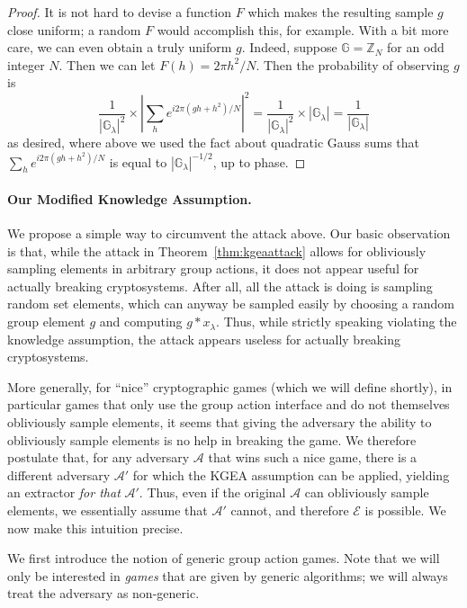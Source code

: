 \documentclass{article}\usepackage[a4paper,margin=20mm]{geometry}
\numberwithin{theorem}{section}
\numberwithin{equation}{section}
\newcommand{\Z}{\mathbb{Z}}
\newcommand{\G}{\mathbb{G}}
\newcommand{\As}{{\mathcal{A}}}
\newcommand{\Es}{{\mathcal{E}}}
\begin{document}
\begin{proof}
	It is not hard to devise a function $F$ which makes the resulting sample $g$ close uniform; a random $F$ would accomplish this, for example. With a bit more care, we can even obtain a truly uniform $g$. Indeed, suppose $\G=\Z_N$ for an odd integer $N$. Then we can let $F(h)=2\pi h^2/N$. Then the probability of observing $g$ is 
	\[\frac{1}{|\G_\lambda|^2}\times \left|\sum_he^{i2\pi (gh+h^2)/N}\right|^2=\frac{1}{|\G_\lambda|^2}\times |\G_\lambda|=\frac{1}{|\G_\lambda|}\]
	as desired, where above we used the fact about quadratic Gauss sums that $\sum_he^{i2\pi (gh+h^2)/N}$ is equal to $|\G_\lambda|^{-1/2}$, up to phase.
\end{proof}



\paragraph{Our Modified Knowledge Assumption.} We propose a simple way to circumvent the attack above. Our basic observation is that, while the attack in Theorem~\ref{thm:kgeaattack} allows for obliviously sampling elements in arbitrary group actions, it does not appear useful for actually breaking cryptosystems. After all, all the attack is doing is sampling random set elements, which can anyway be sampled easily by choosing a random group element $g$ and computing $g*x_\lambda$. Thus, while strictly speaking violating the knowledge assumption, the attack appears useless for actually breaking cryptosystems.

More generally, for ``nice'' cryptographic games (which we will define shortly), in particular games that only use the group action interface and do not themselves obliviously sample elements, it seems that giving the adversary the ability to obliviously sample elements is no help in breaking the game. We therefore postulate that, for any adversary $\As$ that wins such a nice game, there is a different adversary $\As'$ for which the KGEA assumption can be applied, yielding an extractor \emph{for that} $\As'$. Thus, even if the original $\As$ can obliviously sample elements, we essentially assume that $\As'$ cannot, and therefore $\Es$ is possible. We now make this intuition precise.

\medskip

We first introduce the notion of generic group action games. Note that we will only be interested in \emph{games} that are given by generic algorithms; we will always treat the adversary as non-generic.
\end{document}
